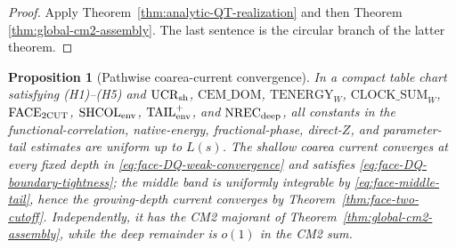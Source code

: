 \documentclass[11pt]{article}
\newtheorem{proposition}[theorem]{Proposition}
\begin{document}
\begin{proof}
Apply Theorem~\ref{thm:analytic-QT-realization} and then Theorem
\ref{thm:global-cm2-assembly}.  The last sentence is the circular branch of
the latter theorem.
\end{proof}

\begin{proposition}[Pathwise coarea-current convergence]
\label{prop:common-refinement-majorant}
In a compact table chart satisfying \textup{(H1)--(H5)} and
$\mathrm{UCR}_{\rm sh}$, $\mathrm{CEM\_DOM}$,
$\mathrm{TENERGY}_{W}$,
$\mathrm{CLOCK\_SUM}_{W}$,
$\mathrm{FACE}_{\rm 2CUT}$, $\mathrm{SHCOL}_{\rm env}$,
$\mathrm{TAIL}_{\rm env}^{+}$, and
$\mathrm{NREC}_{\rm deep}$, all constants in the
functional-correlation, native-energy, fractional-phase, direct-$Z$, and
parameter-tail estimates are uniform up to $L(s)$.  The shallow coarea current
converges at every fixed depth in
\eqref{eq:face-DQ-weak-convergence} and satisfies
\eqref{eq:face-DQ-boundary-tightness}; the middle band is uniformly
integrable by \eqref{eq:face-middle-tail}, hence the growing-depth current
converges by Theorem~\ref{thm:face-two-cutoff}.  Independently, it has the
CM2 majorant of Theorem~\ref{thm:global-cm2-assembly}, while the deep
remainder is $o(1)$ in the CM2 sum.
\end{proposition}
\end{document}

